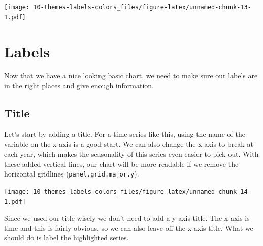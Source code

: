\documentclass[]{book}
\newenvironment{Shaded}{\begin{snugshade}}{\end{snugshade}}
\newcommand{\KeywordTok}[1]{\textcolor[rgb]{0.13,0.29,0.53}{\textbf{{#1}}}}
\newcommand{\DataTypeTok}[1]{\textcolor[rgb]{0.13,0.29,0.53}{{#1}}}
\newcommand{\DecValTok}[1]{\textcolor[rgb]{0.00,0.00,0.81}{{#1}}}
\newcommand{\StringTok}[1]{\textcolor[rgb]{0.31,0.60,0.02}{{#1}}}
\newcommand{\NormalTok}[1]{{#1}}
\theoremstyle{definition}
\theoremstyle{definition}
\theoremstyle{remark}
\begin{document}
\texttt{[image: 10-themes-labels-colors\_files/figure-latex/unnamed-chunk-13-1.pdf]}

\section{Labels}\label{labels}

Now that we have a nice looking basic chart, we need to make sure our
labels are in the right places and give enough information.

\subsection{Title}\label{title}

Let's start by adding a title. For a time series like this, using the
name of the variable on the x-axis is a good start. We can also change
the x-axis to break at each year, which makes the seasonality of this
series even easier to pick out. With these added vertical lines, our
chart will be more readable if we remove the horizontal gridlines
(\texttt{panel.grid.major.y}).

\begin{Shaded}
\end{Shaded}

\texttt{[image: 10-themes-labels-colors\_files/figure-latex/unnamed-chunk-14-1.pdf]}

Since we used our title wisely we don't need to add a y-axis title. The
x-axis is time and this is fairly obvious, so we can also leave off the
x-axis title. What we should do is label the highlighted series.

\begin{Shaded}
\end{Shaded}
\end{document}

